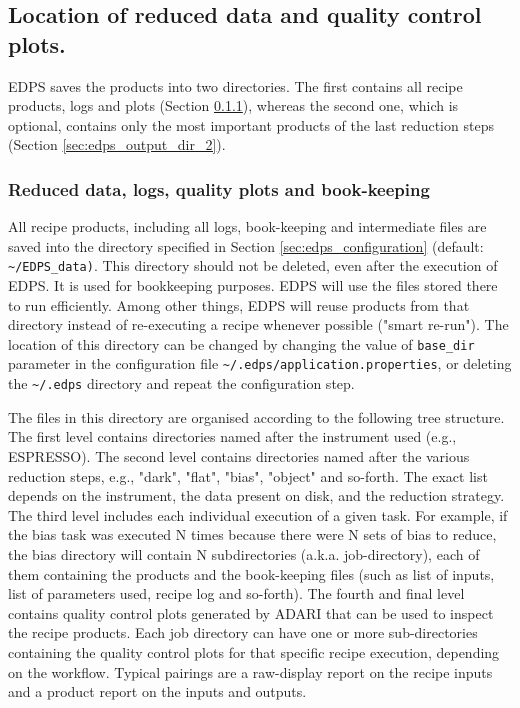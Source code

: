 \subsection{Location of reduced data and quality control plots.}
\label{sec:edps_output_dir}


EDPS saves the products into two directories. The first contains all recipe  products, logs and plots (Section \ref{sec:edps_output_dir_1}), whereas the second one, which is optional, contains only the most important products of the last reduction steps (Section \ref{sec:edps_output_dir_2}).

\subsubsection{Reduced data, logs, quality plots and book-keeping}
\label{sec:edps_output_dir_1}
All recipe products, including all logs, book-keeping and intermediate files are saved into the directory specified in Section \ref{sec:edps_configuration} (default: {\tt \textasciitilde/EDPS\_data)}. This directory should not be deleted, even after the execution of EDPS. It is used for bookkeeping purposes. EDPS will use the files stored there to run efficiently. Among other things, EDPS will reuse products from that directory instead of re-executing a recipe whenever possible ("smart re-run").  The location of this directory can be changed by changing
the value of {\tt base\_dir} parameter in the configuration file {\tt \textasciitilde/.edps/application.properties}, or deleting the {\tt \textasciitilde/.edps} directory and repeat the configuration step. 




The files in this directory are organised according to the following tree structure.
The first level contains directories named after the instrument used (e.g., ESPRESSO). The second level contains directories named after the various reduction steps, e.g., "dark", "flat", "bias", "object" and so-forth. The exact list depends on the instrument, the data present on disk, and the reduction strategy.
The third level includes each individual execution of a given task. For example, if the bias task was executed N times because there were N sets of bias to reduce, the bias directory will contain N subdirectories (a.k.a. job-directory), each of them containing the products and the book-keeping files (such as list of inputs, list of parameters used, recipe log and so-forth).
The fourth and final level contains quality control plots generated by ADARI that can be used to inspect the recipe products. Each job directory can have one or more sub-directories containing the quality control plots for that specific recipe execution, depending on the workflow. Typical pairings are a raw-display report on the recipe inputs and a product report on the inputs and outputs.

